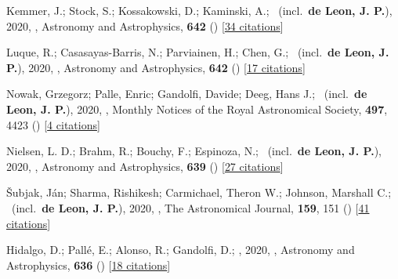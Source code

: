 \item[{\color{numcolor}\scriptsize27}] Kemmer, J.; Stock, S.; Kossakowski, D.; Kaminski, A.; \etal\ (incl.\ \textbf{de Leon, J. P.}), 2020, , Astronomy and Astrophysics, \textbf{642} () [\href{https://ui.adsabs.harvard.edu/abs/2020A&A...642A.236K}{34 citations}]

\item[{\color{numcolor}\scriptsize26}] Luque, R.; Casasayas-Barris, N.; Parviainen, H.; Chen, G.; \etal\ (incl.\ \textbf{de Leon, J. P.}), 2020, , Astronomy and Astrophysics, \textbf{642} () [\href{https://ui.adsabs.harvard.edu/abs/2020A&A...642A..50L}{17 citations}]

\item[{\color{numcolor}\scriptsize25}] Nowak, Grzegorz; Palle, Enric; Gandolfi, Davide; Deeg, Hans J.; \etal\ (incl.\ \textbf{de Leon, J. P.}), 2020, , Monthly Notices of the Royal Astronomical Society, \textbf{497}, 4423 () [\href{https://ui.adsabs.harvard.edu/abs/2020MNRAS.497.4423N}{4 citations}]

\item[{\color{numcolor}\scriptsize24}] Nielsen, L. D.; Brahm, R.; Bouchy, F.; Espinoza, N.; \etal\ (incl.\ \textbf{de Leon, J. P.}), 2020, , Astronomy and Astrophysics, \textbf{639} () [\href{https://ui.adsabs.harvard.edu/abs/2020A&A...639A..76N}{27 citations}]

\item[{\color{numcolor}\scriptsize23}] {\v{S}}ubjak, J{\'a}n; Sharma, Rishikesh; Carmichael, Theron W.; Johnson, Marshall C.; \etal\ (incl.\ \textbf{de Leon, J. P.}), 2020, , The Astronomical Journal, \textbf{159}, 151 () [\href{https://ui.adsabs.harvard.edu/abs/2020AJ....159..151S}{41 citations}]

\item[{\color{numcolor}\scriptsize22}] Hidalgo, D.; Pall{\'e}, E.; Alonso, R.; Gandolfi, D.; \etal, 2020, , Astronomy and Astrophysics, \textbf{636} () [\href{https://ui.adsabs.harvard.edu/abs/2020A&A...636A..89H}{18 citations}]

